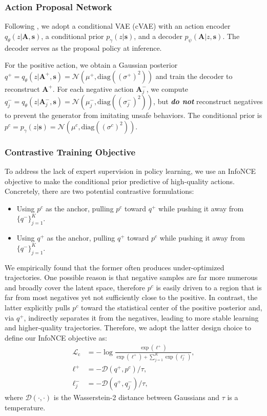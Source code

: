 \documentclass[twocolumn]{template}
\theoremstyle{thmstyleone}%
\theoremstyle{thmstyletwo}%
\theoremstyle{thmstylethree}%
\begin{document}
\subsubsection{Action Proposal Network}
Following \cite{Trajectron++,Agentformer},
we adopt a conditional VAE (cVAE) with an action encoder $q_\theta(z|\mathbf{A},\mathbf{s})$,
a conditional prior $p_\gamma(z|\mathbf{s})$,
and a decoder $p_\psi(\mathbf{A}|z,\mathbf{s})$.
The decoder serves as the proposal policy at inference.

For the positive action, we obtain a Gaussian posterior
$q^{+}=q_\theta(z|\mathbf{A}^{+},\mathbf{s})=\mathcal{N}(\mu^{+},\mathrm{diag}((\sigma^{+})^2))$ and train the decoder to reconstruct $\mathbf{A}^{+}$.
For each negative action $\mathbf{A}^{-}_j$, we compute
$q^{-}_j=q_\theta(z|\mathbf{A}^{-}_j,\mathbf{s})=\mathcal{N}(\mu^{-}_j,\mathrm{diag}((\sigma^{-}_j)^2))$, but \emph{\textbf{do not}} reconstruct negatives to prevent the generator from imitating unsafe behaviors.
The conditional prior is $p^{c}=p_\gamma(z|\mathbf{s})=\mathcal{N}(\mu^{c},\mathrm{diag}((\sigma^{c})^2))$.

\subsubsection{Contrastive Training Objective}
To address the lack of expert supervision in policy learning,
we use an InfoNCE objective to make the conditional prior predictive of high-quality actions.
Concretely, there are two potential contrastive formulations:
\begin{itemize}
    \item Using $p^{c}$ as the anchor, pulling $p^{c}$ toward $q^{+}$ while pushing it away from $\{q^{-}\}_{j=1}^{K}$.
    \item Using $q^{+}$ as the anchor, pulling $q^{+}$ toward $p^{c}$ while pushing it away from $\{q^{-}\}_{j=1}^{K}$.
\end{itemize}
We empirically found that the former often produces under-optimized trajectories.
One possible reason is that negative samples are far more numerous and broadly cover the latent space,
therefore $p^{c}$ is easily driven to a region that is far from most negatives yet not sufficiently close to the positive.
In contrast, the latter explicitly pulls $p^{c}$ toward the statistical center of the positive posterior and,
via $q^{+}$, indirectly separates it from the negatives,
leading to more stable learning and higher-quality trajectories.
Therefore, we adopt the latter design choice to define our InfoNCE objective as:
\begin{equation}
\begin{aligned}
\mathcal{L}_{\text{c}} &= -\log \frac{\exp(\ell^{+})}{\exp(\ell^{+})+\sum_{j=1}^{K}\exp(\ell^{-}_{j})}, \\
\ell^{+} &=-\mathcal{D}(q^{+},p^{c})/\tau, \\
\ell^{-}_{j} &=-\mathcal{D}(q^{+},q^{-}_{j})/\tau, 
\end{aligned}
\end{equation}
where $\mathcal{D}(\cdot,\cdot)$ is the Wasserstein-2 distance between Gaussians and $\tau$ is a temperature.
\end{document}
